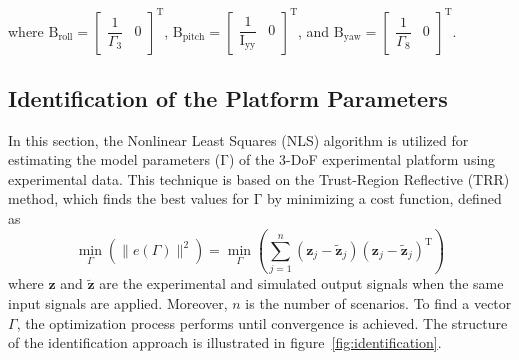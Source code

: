 \documentclass[3p]{elsarticle}
\begin{document}
where $\boldsymbol{\mathrm{B}}_{\text{roll}}  = \begin{bmatrix}
    \dfrac{1}{\Gamma_3}
    &
    0
\end{bmatrix}^{\mathrm{T}}$, $\boldsymbol{\mathrm{B}}_{\text{pitch}}  = \begin{bmatrix}
    \dfrac{1}{\mathrm{I}_{\text{yy}}}
    &
    0
\end{bmatrix}^{\mathrm{T}}$, and $\boldsymbol{\mathrm{B}}_{\text{yaw}}  = \begin{bmatrix}
    \dfrac{1}{\Gamma_8}
    &
    0
\end{bmatrix}^{\mathrm{T}}$.
\subsection{Identification of the Platform Parameters}
\noindent In this section, the Nonlinear Least Squares (NLS) algorithm is utilized for estimating the model parameters ($\boldsymbol{\mathrm{\Gamma}}$) of the 3-DoF experimental platform using experimental data.
This technique is based on the Trust-Region Reflective (TRR) method, which finds the best values for $\boldsymbol{\mathrm{\Gamma}}$ by minimizing a cost function, defined as
\begin{equation}
    \min_{\Gamma}\left(\parallel e(\Gamma) \parallel^2\right) = 
    \min_{\Gamma} \left(\sum_{j=1}^{n}(\boldsymbol{z}_j- \tilde{\boldsymbol{z}}_j)(\boldsymbol{z}_j- \tilde{\boldsymbol{z}}_j)^\mathrm{T}\right)
\end{equation} %
where $\boldsymbol{z}$ and $\tilde{\boldsymbol{z}}$ are the experimental and simulated output signals when the same input signals are applied.
Moreover, $n$ is the number of scenarios.
To find a vector $\Gamma$, the optimization process performs until convergence is achieved. %
The structure of the identification approach is illustrated in figure~\ref{fig:identification}.
\end{document}
